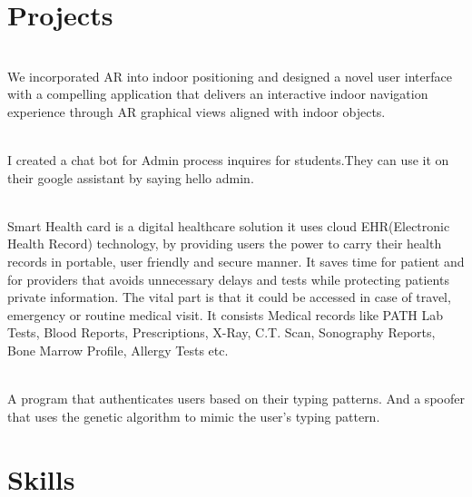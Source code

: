 \documentclass[]{resume-openfont}
\begin{document}
\section{Projects}

\\
We incorporated AR into indoor positioning and designed a novel user interface with a compelling application that delivers an interactive indoor navigation experience through AR graphical views aligned with indoor objects.\\
\sectionsep
  
\hfill \\
I created a chat bot for Admin process inquires for students.They can use it on their google assistant by saying hello admin.\\
\sectionsep

\hfill \\
Smart Health card is a digital healthcare solution it uses cloud EHR(Electronic Health
Record) technology, by providing users the power to carry their health records in
portable, user friendly and secure manner. It saves time for patient and for providers
that avoids unnecessary delays and tests while protecting patients private
information. The vital part is that it could be accessed in case of travel, emergency or
routine medical visit. It consists Medical records like PATH Lab Tests, Blood Reports,
Prescriptions, X-Ray, C.T. Scan, Sonography Reports, Bone Marrow Profile, Allergy
Tests etc.
\sectionsep

\hfill \\
A program that authenticates users based on their typing patterns. And a spoofer that uses the genetic algorithm to mimic the user's typing pattern.
\sectionsep

\section{Skills}
\begin{resumeSkillList}
    \\
    \\
\end{resumeSkillList}

\end{document}
